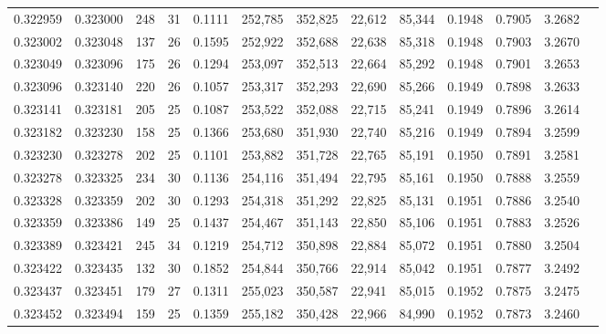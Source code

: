 \begin{tabular}{rrrrrrrrrrrrr}
0.322959 & 0.323000 &   248 &  31 &                                     0.1111 & 252,785 & 352,825 &  22,612 &  85,344 & 0.1948 & 0.7905 & 3.2682 \\
0.323002 & 0.323048 &   137 &  26 &                                     0.1595 & 252,922 & 352,688 &  22,638 &  85,318 & 0.1948 & 0.7903 & 3.2670 \\
0.323049 & 0.323096 &   175 &  26 &                                     0.1294 & 253,097 & 352,513 &  22,664 &  85,292 & 0.1948 & 0.7901 & 3.2653 \\
0.323096 & 0.323140 &   220 &  26 &                                     0.1057 & 253,317 & 352,293 &  22,690 &  85,266 & 0.1949 & 0.7898 & 3.2633 \\
0.323141 & 0.323181 &   205 &  25 &                                     0.1087 & 253,522 & 352,088 &  22,715 &  85,241 & 0.1949 & 0.7896 & 3.2614 \\
0.323182 & 0.323230 &   158 &  25 &                                     0.1366 & 253,680 & 351,930 &  22,740 &  85,216 & 0.1949 & 0.7894 & 3.2599 \\
0.323230 & 0.323278 &   202 &  25 &                                     0.1101 & 253,882 & 351,728 &  22,765 &  85,191 & 0.1950 & 0.7891 & 3.2581 \\
0.323278 & 0.323325 &   234 &  30 &                                     0.1136 & 254,116 & 351,494 &  22,795 &  85,161 & 0.1950 & 0.7888 & 3.2559 \\
0.323328 & 0.323359 &   202 &  30 &                                     0.1293 & 254,318 & 351,292 &  22,825 &  85,131 & 0.1951 & 0.7886 & 3.2540 \\
0.323359 & 0.323386 &   149 &  25 &                                     0.1437 & 254,467 & 351,143 &  22,850 &  85,106 & 0.1951 & 0.7883 & 3.2526 \\
0.323389 & 0.323421 &   245 &  34 &                                     0.1219 & 254,712 & 350,898 &  22,884 &  85,072 & 0.1951 & 0.7880 & 3.2504 \\
0.323422 & 0.323435 &   132 &  30 &                                     0.1852 & 254,844 & 350,766 &  22,914 &  85,042 & 0.1951 & 0.7877 & 3.2492 \\
0.323437 & 0.323451 &   179 &  27 &                                     0.1311 & 255,023 & 350,587 &  22,941 &  85,015 & 0.1952 & 0.7875 & 3.2475 \\
0.323452 & 0.323494 &   159 &  25 &                                     0.1359 & 255,182 & 350,428 &  22,966 &  84,990 & 0.1952 & 0.7873 & 3.2460 \\

\end{tabular}
